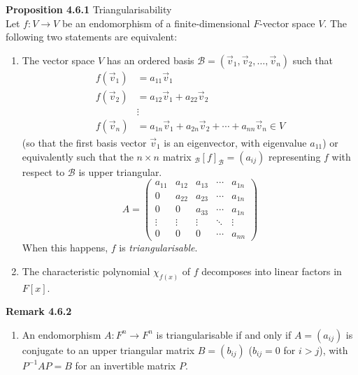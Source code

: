 \documentclass[8pt,landscape]{article}
\begin{document}
\begin{multicols}{3}
    \textbf{Proposition 4.6.1} Triangularisability \\
    Let $f : V \to V$ be an endomorphism of a finite-dimensional $F$-vector space $V$.
    The following two statements are equivalent:
    \begin{enumerate}
        \item The vector space $V$ has an ordered basis
            $\mathcal{B} = (\vec{v}_1, \vec{v}_2, \ldots, \vec{v}_n)$ such that
            \begin{align*}{}
                f(\vec{v}_1) &= a_{11}\vec{v}_1 \\
                f(\vec{v}_2) &= a_{12}\vec{v}_1 + a_{22}\vec{v}_2 \\
                             &\vdots \\
                f(\vec{v}_n) &= a_{1n}\vec{v}_1 + a_{2n}\vec{v}_2 + \cdots +
                a_{nn}\vec{v}_n \in V
            \end{align*}
            (so that the first basis vector $\vec{v}_1$ is an eigenvector,
            with eigenvalue $a_{11}$) or equivalently such that the $n \times n$ matrix
            $_\mathcal{B}{[f]}_\mathcal{B} = (a_{ij})$ representing $f$ with respect to
            $\mathcal{B}$ is upper triangular.
            \[
                A =
                \begin{pmatrix}{}
                    a_{11} & a_{12} & a_{13} & \cdots & a_{1n} \\
                    0      & a_{22} & a_{23} & \cdots & a_{1n} \\
                    0      & 0      & a_{33} & \cdots & a_{1n} \\
                    \vdots & \vdots & \vdots & \ddots & \vdots \\
                    0      & 0      & 0      & \cdots & a_{nn}
                \end{pmatrix}
            \]
            When this happens, $f$ is \emph{triangularisable}.

        \item The characteristic polynomial $\chi_{f(x)}$ of $f$ decomposes into linear
            factors in $F[x]$.

    \end{enumerate}

    \textbf{Remark 4.6.2}
    \begin{enumerate}
        \item An endomorphism $A : F^n \to F^n$ is triangularisable if and only if
            $A = (a_{ij})$ is conjugate to an upper triangular matrix $B = (b_{ij})$
            ($b_{ij} = 0$ for $i > j$), with $P^{-1} AP = B$ for an invertible matrix $P$.


\end{enumerate}
\end{multicols}
\end{document}
